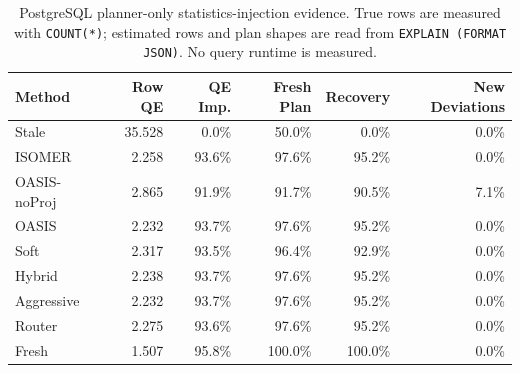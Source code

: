 \begin{table}[t]
  \centering
  \small
  \caption{PostgreSQL planner-only statistics-injection evidence. True rows are measured with \texttt{COUNT(*)}; estimated rows and plan shapes are read from \texttt{EXPLAIN (FORMAT JSON)}. No query runtime is measured.}
  \label{tab:postgres_planner_stats_injection}
  \setlength{\tabcolsep}{4pt}
  \begin{tabular}{lrrrrr}
    \toprule
    Method & Row QE & QE Imp. & Fresh Plan & Recovery & New Deviations \\
    \midrule
    Stale & 35.528 & 0.0\% & 50.0\% & 0.0\% & 0.0\% \\
    ISOMER & 2.258 & 93.6\% & 97.6\% & 95.2\% & 0.0\% \\
    OASIS-noProj & 2.865 & 91.9\% & 91.7\% & 90.5\% & 7.1\% \\
    OASIS & 2.232 & 93.7\% & 97.6\% & 95.2\% & 0.0\% \\
    Soft & 2.317 & 93.5\% & 96.4\% & 92.9\% & 0.0\% \\
    Hybrid & 2.238 & 93.7\% & 97.6\% & 95.2\% & 0.0\% \\
    Aggressive & 2.232 & 93.7\% & 97.6\% & 95.2\% & 0.0\% \\
    Router & 2.275 & 93.6\% & 97.6\% & 95.2\% & 0.0\% \\
    Fresh & 1.507 & 95.8\% & 100.0\% & 100.0\% & 0.0\% \\
    \bottomrule
  \end{tabular}
\end{table}
